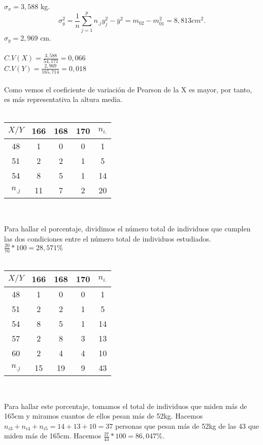     $\sigma_x = 3,588$ kg. \\
    \[ \sigma_y^2 = \frac{1}{n}\sum_{j=1}^{p}n_{.j}y_j^2-\bar{y}^2 = m_{02}-m_{01}^2 = 8,813cm^2.\]
    $\sigma_y = 2,969$ cm. \\ \\
    $C.V(X) = \frac{3,588}{54,171} = 0,066$ \\
    $C.V(Y) = \frac{2,969}{165,714} = 0,018$ \\  \\
    Como vemos el coeficiente de variación de Pearson de la X es mayor, por tanto, es más representativa la altura media. \\ \\
    
\subproblem
    \begin{center}
    \begin{tabular}{| c | c | c | c | c |}
        \hline
        $X / Y$ & 166 & 168 & 170 & $n_{i.}$ \\ \hline
        48 & 1 & 0 & 0 & 1 \\
        51 & 2 & 2 & 1 & 5 \\
        54 & 8 & 5 & 1 & 14 \\
        $n_{.j}$ & 11 & 7 & 2 & 20 \\
        \hline
    \end{tabular} \\ 
    \end{center}
    Para hallar el porcentaje, dividimos el número total de individuos que cumplen las dos condiciones entre el número total de individuos estudiados. \\
    $\frac{20}{70}*100 = 28,571\%$ \\ \\
    
\subproblem
    \begin{center}
    \begin{tabular}{| c | c | c | c | c |}
        \hline
        $X / Y$ & 166 & 168 & 170 & $n_{i.}$ \\ \hline
        48 & 1 & 0 & 0 & 1 \\
        51 & 2 & 2 & 1 & 5 \\
        54 & 8 & 5 & 1 & 14 \\
        57 & 2 & 8 & 3 & 13 \\
        60 & 2 & 4 & 4 & 10 \\
        $n_{.j}$ & 15 & 19 & 9 & 43 \\
        \hline
    \end{tabular} \\
    \end{center}
    Para hallar este porcentaje, tomamos el total de individuos que miden más de 165cm y miramos cuantos de ellos pesan más de 52kg. Hacemos $n_{i3}+n_{i4}+n_{i5} = 14+13+10 = 37$ personas que pesan más de 52kg de las 43 que miden más de 165cm. Hacemos $\frac{37}{43}*100 = 86,047\%$. \\ \\
    
